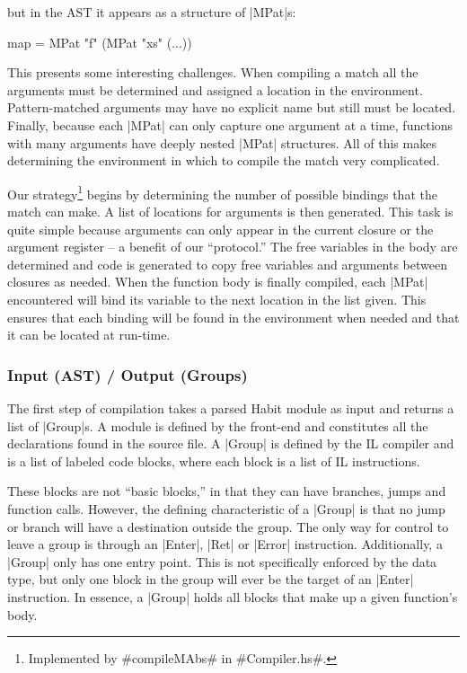 \documentclass[11pt]{article}
\begin{document}
\noindent
but in the AST it appears as a structure of |MPat|s:

\begin{code}
  map = MPat "f" (MPat "xs" (...))
\end{code}

This presents some interesting challenges. When compiling a match all
the arguments must be determined and assigned a location in the
environment. Pattern-matched arguments may have no explicit name but
still must be located. Finally, because each |MPat| can only capture
one argument at a time, functions with many arguments have deeply
nested |MPat| structures. All of this makes determining the environment
in which to compile the match very complicated. 

Our strategy\footnote{Implemented by #compileMAbs# in
  #Compiler\Register\Compiler.hs#.} begins by determining the number of
possible bindings that the match can make. A list of locations for
arguments is then generated. This task is quite simple because
arguments can only appear in the current closure or the argument
register -- a benefit of our ``protocol.'' The free variables in the body are determined and code is
generated to copy free variables and arguments between closures as
needed. When the function body is finally compiled, each |MPat|
encountered will bind its variable to the next location in the list
given. This ensures that each binding will be found in the environment
when needed and that it can be located at run-time.

\subsubsection{Input (AST) / Output (Groups)}
\label{subsec_input_output}
The first step of compilation takes a parsed Habit module as input and
returns a list of |Group|s. A module is defined by the front-end and
constitutes all the declarations found in the source file. A
|Group| is defined by the IL compiler and is a list of labeled code
blocks, where each block is a list of IL instructions.

These blocks are not ``basic blocks,'' in that they can have branches,
jumps and function calls. However, the defining characteristic of a
|Group| is that no jump or branch will have a destination outside the
group. The only way for control to leave a group is through an |Enter|,
|Ret| or |Error| instruction. Additionally, a |Group| only has one entry
point. This is not specifically enforced by the data type, but only
one block in the group will ever be the target of an |Enter|
instruction. In essence, a |Group| holds all blocks that make up a
given function's body. 
\end{document}
